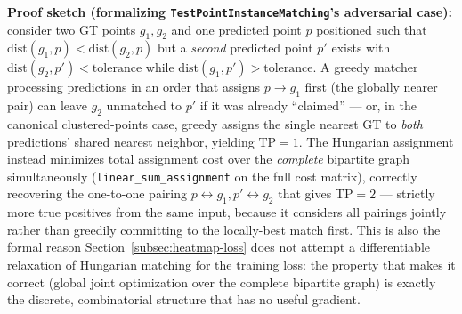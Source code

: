 \textbf{Proof sketch (formalizing \texttt{TestPointInstanceMatching}'s adversarial case):}
consider two GT points $g_1, g_2$ and one predicted point $p$ positioned such that
$\mathrm{dist}(g_1,p) < \mathrm{dist}(g_2,p)$ but a \emph{second} predicted point $p'$ exists with
$\mathrm{dist}(g_2,p') < \mathrm{tolerance}$ while $\mathrm{dist}(g_1,p') > \mathrm{tolerance}$. A
greedy matcher processing predictions in an order that assigns $p \to g_1$ first (the globally
nearer pair) can leave $g_2$ unmatched to $p'$ if it was already ``claimed'' --- or, in the
canonical clustered-points case, greedy assigns the single nearest GT to \emph{both} predictions'
shared nearest neighbor, yielding $\mathrm{TP}=1$. The Hungarian assignment instead minimizes
total assignment cost over the \emph{complete} bipartite graph simultaneously
(\texttt{linear\_sum\_assignment} on the full cost matrix), correctly recovering the one-to-one
pairing $p{\leftrightarrow}g_1, p'{\leftrightarrow}g_2$ that gives $\mathrm{TP}=2$ --- strictly
more true positives from the same input, because it considers all pairings jointly rather than
greedily committing to the locally-best match first. This is also the formal reason
Section~\ref{subsec:heatmap-loss} does not attempt a differentiable relaxation of Hungarian
matching for the training loss: the property that makes it correct (global joint optimization
over the complete bipartite graph) is exactly the discrete, combinatorial structure that has no
useful gradient.
